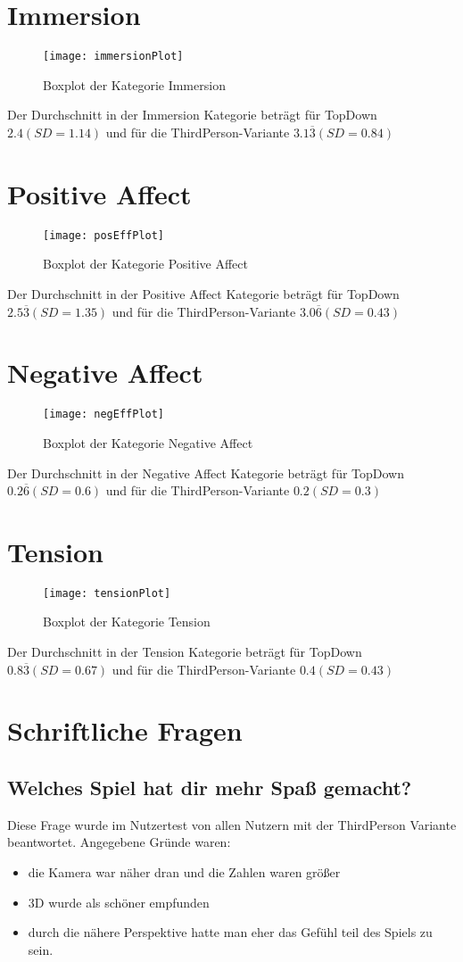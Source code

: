 \section{Immersion}
\begin{figure}[h!tb]
	\centering
	\texttt{[image: immersionPlot]}
	\caption{Boxplot der Kategorie Immersion\label{fig:immersionbox}}
\end{figure}
Der Durchschnitt in der Immersion Kategorie beträgt für TopDown  $2.4 (SD = 1.14)$ und für die ThirdPerson-Variante $3.1\overline{3} (SD =0.84 )$
\newpage
\section{Positive Affect}
\begin{figure}[htb]
	\centering
	\texttt{[image: posEffPlot]}
	\caption{Boxplot der Kategorie Positive Affect\label{fig:poseffbox}}
\end{figure}
Der Durchschnitt in der Positive Affect Kategorie beträgt für TopDown  $2.5\overline{3} (SD = 1.35)$ und für die ThirdPerson-Variante $3.0\overline{6} (SD =0.43 )$
\section{Negative Affect}
\begin{figure}[h!tb]
	\centering
	\texttt{[image: negEffPlot]}
	\caption{Boxplot der Kategorie Negative Affect\label{fig:negeffbox}}
\end{figure}
Der Durchschnitt in der Negative Affect Kategorie beträgt für TopDown  $0.2\overline{6} (SD = 0.6)$ und für die ThirdPerson-Variante $0.2 (SD =0.3 )$
\newpage
\section{Tension}
\begin{figure}[htb]
	\centering
	\texttt{[image: tensionPlot]}
	\caption{Boxplot der Kategorie Tension\label{fig:tensionbox}}
\end{figure}
Der Durchschnitt in der Tension Kategorie beträgt für TopDown  $0.8\overline{3} (SD = 0.67)$ und für die ThirdPerson-Variante $0.4 (SD =0.43 )$
\section{Schriftliche Fragen}
\subsection{Welches Spiel hat dir mehr Spaß gemacht?}
Diese Frage wurde im Nutzertest von allen Nutzern mit der ThirdPerson Variante beantwortet. Angegebene Gründe waren:
\begin{itemize}
\item die Kamera war näher dran und die Zahlen waren größer
\item 3D wurde als schöner empfunden
\item durch die nähere Perspektive hatte man eher das Gefühl teil des Spiels zu sein.
\end{itemize}
